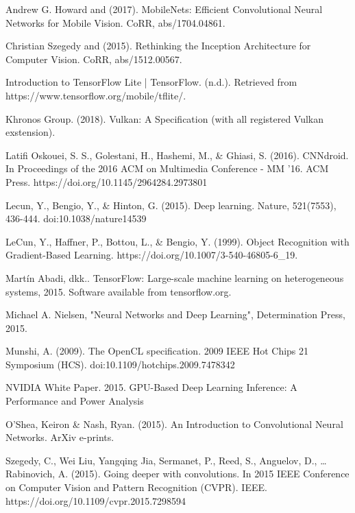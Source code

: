 %
% 

% 
% 
\begin{thebibliography}{4}

{Andrew G. Howard and (2017). MobileNets: Efficient Convolutional Neural Networks for Mobile Vision. CoRR, abs/1704.04861.}

{Christian Szegedy and (2015). Rethinking the Inception Architecture for Computer Vision. CoRR, abs/1512.00567.}

{Introduction to TensorFlow Lite | TensorFlow. (n.d.). Retrieved from https://www.tensorflow.org/mobile/tflite/.}

{Khronos Group. (2018). Vulkan: A Specification (with all registered Vulkan exstension).}

{Latifi Oskouei, S. S., Golestani, H., Hashemi, M., \& Ghiasi, S. (2016). CNNdroid. In Proceedings of the 2016 ACM on Multimedia Conference - MM ’16. ACM Press. https://doi.org/10.1145/2964284.2973801}

{Lecun, Y., Bengio, Y., \& Hinton, G. (2015). Deep learning. Nature, 521(7553), 436-444. doi:10.1038/nature14539}

{LeCun, Y., Haffner, P., Bottou, L., \& Bengio, Y. (1999). Object Recognition with Gradient-Based Learning. https://doi.org/10.1007/3-540-46805-6\_19.}

{Martín Abadi, dkk.. TensorFlow: Large-scale machine learning on heterogeneous systems, 2015. Software available from tensorflow.org.}

{Michael A. Nielsen, "Neural Networks and Deep Learning", Determination Press, 2015.}

{Munshi, A. (2009). The OpenCL specification. 2009 IEEE Hot Chips 21 Symposium (HCS). doi:10.1109/hotchips.2009.7478342}

{NVIDIA White Paper. 2015. GPU-Based Deep Learning Inference: A Performance and Power Analysis}

{O'Shea, Keiron \& Nash, Ryan. (2015). An Introduction to Convolutional Neural Networks. ArXiv e-prints.}

{Szegedy, C., Wei Liu, Yangqing Jia, Sermanet, P., Reed, S., Anguelov, D., … Rabinovich, A. (2015). Going deeper with convolutions. In 2015 IEEE Conference on Computer Vision and Pattern Recognition (CVPR). IEEE. https://doi.org/10.1109/cvpr.2015.7298594}

\end{thebibliography}

